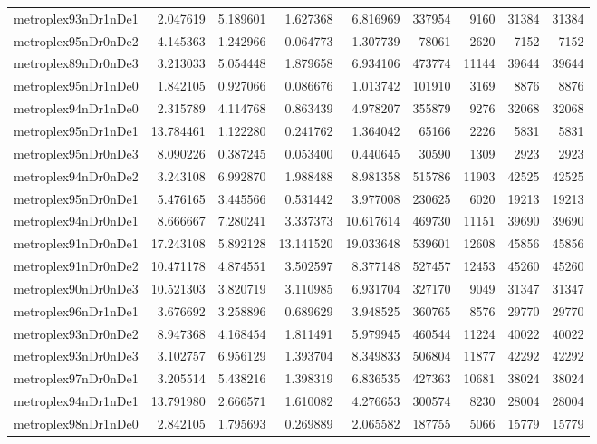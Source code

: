 \begin{longtable}{|l|r|r|r|r|r|r|r|r|}
metroplex93nDr1nDe1 & 2.047619 & 5.189601 & 1.627368 & 6.816969 & 337954 & 9160 & 31384 & 31384 \\
metroplex95nDr0nDe2 & 4.145363 & 1.242966 & 0.064773 & 1.307739 & 78061 & 2620 & 7152 & 7152 \\
metroplex89nDr0nDe3 & 3.213033 & 5.054448 & 1.879658 & 6.934106 & 473774 & 11144 & 39644 & 39644 \\
metroplex95nDr1nDe0 & 1.842105 & 0.927066 & 0.086676 & 1.013742 & 101910 & 3169 & 8876 & 8876 \\
metroplex94nDr1nDe0 & 2.315789 & 4.114768 & 0.863439 & 4.978207 & 355879 & 9276 & 32068 & 32068 \\
metroplex95nDr1nDe1 & 13.784461 & 1.122280 & 0.241762 & 1.364042 & 65166 & 2226 & 5831 & 5831 \\
metroplex95nDr0nDe3 & 8.090226 & 0.387245 & 0.053400 & 0.440645 & 30590 & 1309 & 2923 & 2923 \\
metroplex94nDr0nDe2 & 3.243108 & 6.992870 & 1.988488 & 8.981358 & 515786 & 11903 & 42525 & 42525 \\
metroplex95nDr0nDe1 & 5.476165 & 3.445566 & 0.531442 & 3.977008 & 230625 & 6020 & 19213 & 19213 \\
metroplex94nDr0nDe1 & 8.666667 & 7.280241 & 3.337373 & 10.617614 & 469730 & 11151 & 39690 & 39690 \\
metroplex91nDr0nDe1 & 17.243108 & 5.892128 & 13.141520 & 19.033648 & 539601 & 12608 & 45856 & 45856 \\
metroplex91nDr0nDe2 & 10.471178 & 4.874551 & 3.502597 & 8.377148 & 527457 & 12453 & 45260 & 45260 \\
metroplex90nDr0nDe3 & 10.521303 & 3.820719 & 3.110985 & 6.931704 & 327170 & 9049 & 31347 & 31347 \\
metroplex96nDr1nDe1 & 3.676692 & 3.258896 & 0.689629 & 3.948525 & 360765 & 8576 & 29770 & 29770 \\
metroplex93nDr0nDe2 & 8.947368 & 4.168454 & 1.811491 & 5.979945 & 460544 & 11224 & 40022 & 40022 \\
metroplex93nDr0nDe3 & 3.102757 & 6.956129 & 1.393704 & 8.349833 & 506804 & 11877 & 42292 & 42292 \\
metroplex97nDr0nDe1 & 3.205514 & 5.438216 & 1.398319 & 6.836535 & 427363 & 10681 & 38024 & 38024 \\
metroplex94nDr1nDe1 & 13.791980 & 2.666571 & 1.610082 & 4.276653 & 300574 & 8230 & 28004 & 28004 \\
metroplex98nDr1nDe0 & 2.842105 & 1.795693 & 0.269889 & 2.065582 & 187755 & 5066 & 15779 & 15779 \\

\end{longtable}
